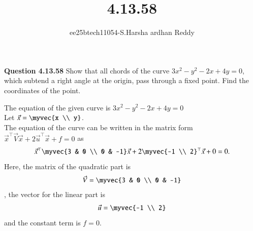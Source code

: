 \documentclass[journal]{IEEEtran}
\begin{document}

\vspace{3cm}
\title{4.13.58}
\author{ee25btech11054-S.Harsha ardhan Reddy}
\maketitle
\renewcommand{\thefigure}{\theenumi}
\renewcommand{\thetable}{\theenumi}
\setlength{\intextsep}{10pt} %
\renewcommand{\thetable}{\theenumi}
\textbf{Question 4.13.58}
Show that all chords of the curve $3x^2 - y^2 - 2x + 4y = 0$, which subtend a right angle at the origin, pass through a fixed point. Find the coordinates of the point.

\solution
The equation of the given curve is
$3x^2 - y^2 - 2x + 4y = 0 $\\
Let $\vec{x} = \myvec{x \\ y}$.\\
The equation of the curve can be written in the matrix form $\vec{x}^\top {\vec{V}}\vec{x} + 2\vec{u}^\top\vec{x} + f = 0$ as
\begin{align}
\vec{x}^\top \myvec{3 & 0 \\ 0 & -1} \vec{x} + 2\myvec{-1 \\ 2}^\top\vec{x} + 0 = 0.
\end{align}
Here, the matrix of the quadratic part is 
\begin{align}
\vec{V} = \myvec{3 & 0 \\ 0 & -1}
\end{align}, 
the vector for the linear part is 
\begin{align}
\vec{u} = \myvec{-1 \\ 2}
\end{align}
and the constant term is $f=0$.
\end{document}
